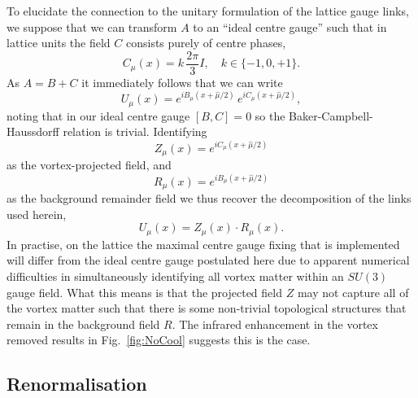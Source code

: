 To elucidate the connection to the unitary formulation of the lattice gauge links, we suppose that we can transform $A$ to an ``ideal centre gauge'' such that in lattice units the field $C$ consists purely of centre phases,
%
\begin{equation}
C_\mu(x) = k\,\frac{2\pi}{3} I,\quad k\in \{-1,0,+1\}.
\end{equation}
%
As $A = B + C$ it immediately follows that we can write
\begin{equation}
U_{\mu}(x) = e^{i B_{\mu}(x+\hat{\mu}/2)} \, e^{i C_{\mu}(x+\hat{\mu}/2)},
\end{equation}
noting that in our ideal centre gauge $[B,C] = 0$ so the Baker-Campbell-Haussdorff relation is trivial. Identifying
\begin{equation}
Z_{\mu}(x) = e^{i C_{\mu}(x+\hat{\mu}/2)}
\end{equation}
as the vortex-projected field, and
\begin{equation}
R_{\mu}(x) = e^{i B_{\mu}(x+\hat{\mu}/2)}
\end{equation}
as the background remainder field we thus recover the decomposition of the links used herein,
\begin{equation}
U_{\mu}(x) = Z_{\mu}(x)\cdot R_{\mu}(x).
\end{equation}
In practise, on the lattice the maximal centre gauge fixing that is implemented will differ from the ideal centre gauge postulated here due to apparent numerical difficulties in simultaneously identifying all vortex matter within an $SU(3)$ gauge field. What this means is that the projected field $Z$ may not capture all of the vortex matter such that there is some non-trivial topological structures that remain in the background field $R.$ The infrared enhancement in the vortex removed results in Fig.~\ref{fig:NoCool} suggests this is the case.\\

\subsection{Renormalisation}\label{sec:Renormalisation}

